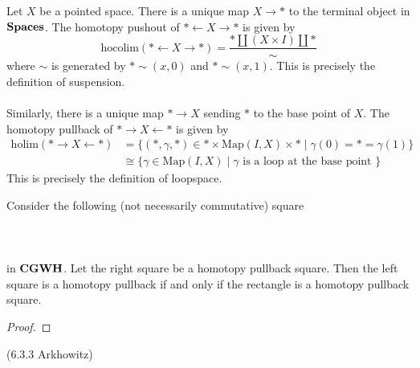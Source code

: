 \documentclass[a4paper]{article}
\begin{document}
\begin{eg}{}{} Let $X$ be a pointed space. There is a unique map $X\to\ast$ to the terminal object in $\bold{Spaces}$. The homotopy pushout of $\ast\leftarrow X\rightarrow\ast$ is given by $$\text{hocolim}(\ast\leftarrow X\rightarrow\ast)=\frac{\ast\amalg(X\times I)\amalg\ast}{\sim}$$ where $\sim$ is generated by $\ast\sim(x,0)$ and $\ast\sim(x,1)$. This is precisely the definition of suspension. \\~\\

Similarly, there is a unique map $\ast\to X$ sending $\ast$ to the base point of $X$. The homotopy pullback of $\ast\rightarrow X\leftarrow\ast$ is given by 
\begin{align*}
\text{holim}(\ast\rightarrow X\leftarrow\ast)&=\{(\ast,\gamma,\ast)\in\ast\times\text{Map}(I,X)\times\ast\;|\;\gamma(0)=\ast=\gamma(1)\}\\
&\cong\{\gamma\in\text{Map}(I,X)\;|\;\gamma\text{ is a loop at the base point }\}
\end{align*}
This is precisely the definition of loopspace. 
\end{eg}

\begin{prp}{}{} Consider the following (not necessarily commutative) square \\~\\
\\~\\
in $\bold{CGWH}$. Let the right square be a homotopy pullback square. Then the left square is a homotopy pullback if and only if the rectangle is a homotopy pullback square. \tcbline
\begin{proof}

\end{proof}
\end{prp} (6.3.3 Arkhowitz)
\end{document}
